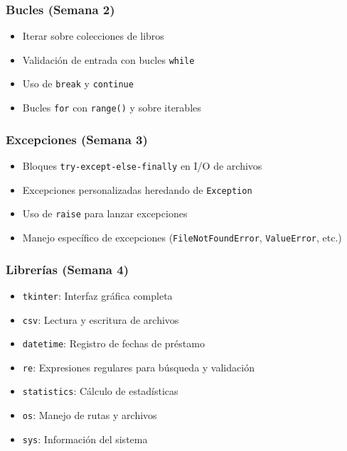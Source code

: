 \documentclass[12pt,a4paper]{article}
\begin{document}
\subsubsection{Bucles (Semana 2)}
\begin{itemize}[leftmargin=*]
    \item Iterar sobre colecciones de libros
    \item Validación de entrada con bucles \texttt{while}
    \item Uso de \texttt{break} y \texttt{continue}
    \item Bucles \texttt{for} con \texttt{range()} y sobre iterables
\end{itemize}

\subsubsection{Excepciones (Semana 3)}
\begin{itemize}[leftmargin=*]
    \item Bloques \texttt{try-except-else-finally} en I/O de archivos
    \item Excepciones personalizadas heredando de \texttt{Exception}
    \item Uso de \texttt{raise} para lanzar excepciones
    \item Manejo específico de excepciones (\texttt{FileNotFoundError}, \texttt{ValueError}, etc.)
\end{itemize}

\subsubsection{Librerías (Semana 4)}
\begin{itemize}[leftmargin=*]
    \item \texttt{tkinter}: Interfaz gráfica completa
    \item \texttt{csv}: Lectura y escritura de archivos
    \item \texttt{datetime}: Registro de fechas de préstamo
    \item \texttt{re}: Expresiones regulares para búsqueda y validación
    \item \texttt{statistics}: Cálculo de estadísticas
    \item \texttt{os}: Manejo de rutas y archivos
    \item \texttt{sys}: Información del sistema
\end{itemize}
\end{document}
